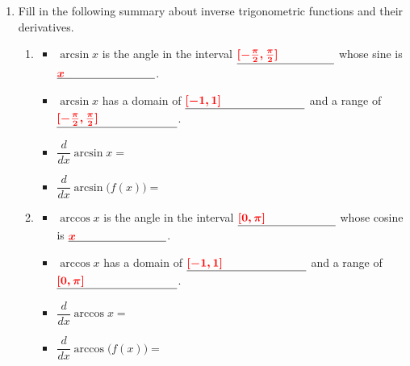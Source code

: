 \documentclass{article}
\begin{document}
\begin{enumerate}
\item Fill in the following summary about inverse trigonometric functions and their derivatives. 

\begin{enumerate}
    
\item
\begin{itemize}
    
    

    \item$\arcsin x$ is the angle in the interval $\fitb{1.2in}{\solonly\textcolor{red}{[-\frac{\pi}{2},\frac{\pi}{2}]}}$ whose sine is $\fitb{1.2in}{\solonly\textcolor{red}{x}}$.
    \vspace{0.3cm}
    \item$\arcsin x$ has a domain of $\fitb{1.47in}{\solonly\textcolor{red}{[-1,1]}}$ and a range of $\fitb{1.47in}{\solonly\textcolor{red}{[-\frac{\pi}{2},\frac{\pi}{2}]}}$. \vspace{0.3cm}


   
        \item $\dfrac{d}{dx}\arcsin x=$  
        \vspace{0.3cm}
        \item $\dfrac{d}{dx}\arcsin \bigl(f(x)\bigl)=$

\end{itemize}
\vfill\item  
\begin{itemize}
    \item$\arccos x$ is the angle in the interval $\fitb{1.2in}{\solonly\textcolor{red}{[0,\pi]}}$ whose cosine is $\fitb{1.2in}{\solonly\textcolor{red}{x}}$.
    \vspace{0.3cm}
    \item$\arccos x$ has a domain of $\fitb{1.47in}{\solonly\textcolor{red}{[-1,1]}}$ and a range of $\fitb{1.47in}{\solonly\textcolor{red}{[0,\pi]}}$. \vspace{0.3cm}


   
        \item $\dfrac{d}{dx}\arccos x=$  
        \vspace{0.3cm}
        \item $\dfrac{d}{dx}\arccos \bigl(f(x)\bigl)=$
\end{itemize}


\end{enumerate}
\end{enumerate}
\end{document}
